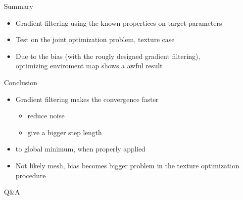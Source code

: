 \documentclass[beamer]{standalone}
\begin{document}
\begin{frame}{Summary}

\begin{itemize}
    \setlength\itemsep{1em}
    \item Gradient filtering using the known propertices on target parameters
    \item Test on the joint optimization problem, texture case
    \item Due to the bias (with the rougly designed gradient filtering), \\ 
    optimizing enviroment map shows a awful result
\end{itemize}
\end{frame}

\begin{frame}{Conclusion}

    \begin{itemize}
        \setlength\itemsep{1em}
        \item Gradient filtering makes the convergence faster
        \begin{itemize}
            \item reduce noise
            \item give a bigger step length
        \end{itemize}
        \item to global minimum, when properly applied 
        \item Not likely mesh, bias becomes bigger problem in the texture optimization procedure
    \end{itemize}
    
        \note[item]{
        }
        
    \end{frame}

    \begin{frame}{Q\&A}

    \end{frame}
\end{document}
